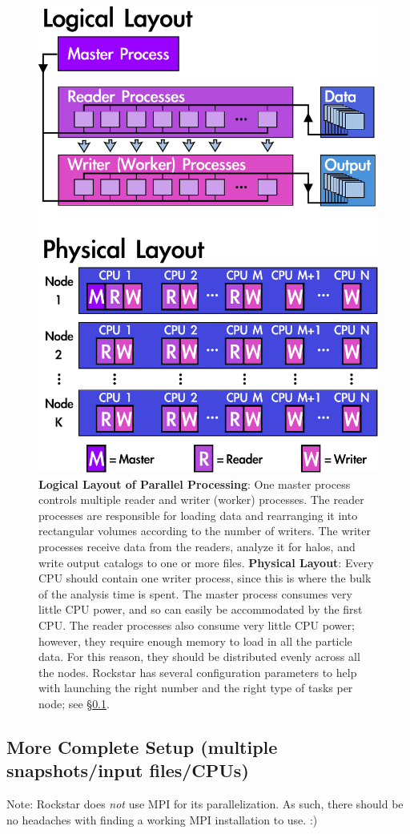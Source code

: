 \documentclass[12pt]{article}
\begin{document}
\begin{figure}
\vspace{-11ex}
\includegraphics[width=0.8\columnwidth]{rockstar_layout.pdf}
\caption{\textbf{Logical Layout of Parallel Processing}: One master process controls multiple reader and writer (worker) processes.  The reader processes are responsible for loading data and rearranging it into rectangular volumes according to the number of writers.  The writer processes receive data from the readers, analyze it for halos, and write output catalogs to one or more files.  \textbf{Physical Layout}: Every CPU should contain one writer process, since this is where the bulk of the analysis time is spent.  The master process consumes very little CPU power, and so can easily be accommodated by the first CPU.  The reader processes also consume very little CPU power; however, they require enough memory to load in all the particle data.  For this reason, they should be distributed evenly across all the nodes.  Rockstar has several configuration parameters to help with launching the right number and the right type of tasks per node; see \S \ref{s:parallel_io}.}
\label{f:layout}
\end{figure}

\subsection{More Complete Setup (multiple snapshots/input files/CPUs)}
\label{s:parallel_io}
      Note: Rockstar does \textit{not} use MPI for its parallelization.  As such,
      there should be no headaches with finding a working MPI installation
      to use. :)
\end{document}
